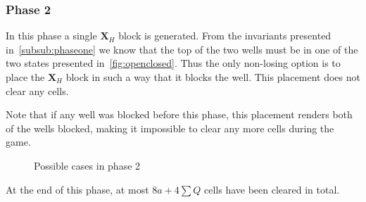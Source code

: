 \subsubsection{Phase 2}
\label{subsub:phasetwo}
In this phase a single $\mathbf{X}_H$ block is generated. From the invariants presented in~\ref{subsub:phaseone} we know that the top of the two wells must be in one of the two states presented in~\autoref{fig:openclosed}. Thus the only non-losing option is to place the $\mathbf{X}_H$ block in such a way that it blocks the well. This placement does not clear any cells.

Note that if any well was blocked before this phase, this placement renders both of the wells blocked, making it impossible to clear any more cells during the game.

\begin{figure}[H]
    \centering
    \begin{subfigure}[b]{0.35\textwidth}
        \caption{}
        \vspace*{0.5cm}
    \end{subfigure}
    \hspace{0.05\textwidth}
    \begin{subfigure}[b]{0.35\textwidth}
        \caption{}
        \vspace*{0.5cm}
    \end{subfigure}

    \begin{subfigure}[b]{0.35\textwidth}
        \caption{}
    \end{subfigure}

    \caption{Possible cases in phase 2}
    \label{fig:placement}
\end{figure}

At the end of this phase, at most $8a + 4 \sum Q$ cells have been cleared in total.
